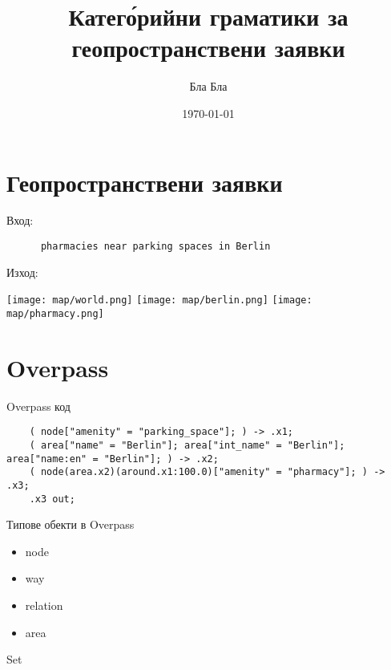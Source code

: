 \documentclass[9pt]{beamer}
\title{Катег\'орийни граматики за геопространствени заявки}
\date{\today}
\author{Бла Бла}
\institute{Магистър университет ФМИ бла}
\begin{document}
  \maketitle

  \section{Геопространствени заявки}
  \begin{frame}[fragile]
    Вход:
    \begin{lstwrap}\begin{lstlisting}
      pharmacies near parking spaces in Berlin
    \end{lstlisting}\end{lstwrap}
    Изход:

    \texttt{[image: map/world.png]}
    \hfill
    \texttt{[image: map/berlin.png]}
    \hfill
    \texttt{[image: map/pharmacy.png]}
  \end{frame}

  \section{Overpass}
  \begin{frame}[fragile]{Overpass код}
    \begin{lstwrap}\begin{lstlisting}
    ( node["amenity" = "parking_space"]; ) -> .x1;
    ( area["name" = "Berlin"]; area["int_name" = "Berlin"]; area["name:en" = "Berlin"]; ) -> .x2;
    ( node(area.x2)(around.x1:100.0)["amenity" = "pharmacy"]; ) -> .x3;
    .x3 out;
    \end{lstlisting}\end{lstwrap}
  \end{frame}

  \begin{frame}{Типове обекти в Overpass}
    \begin{itemize}
      \item node
      \item way
      \item relation
      \item area
    \end{itemize}
  \end{frame}

  \begin{frame}{Set}

  \end{frame}
\end{document}
